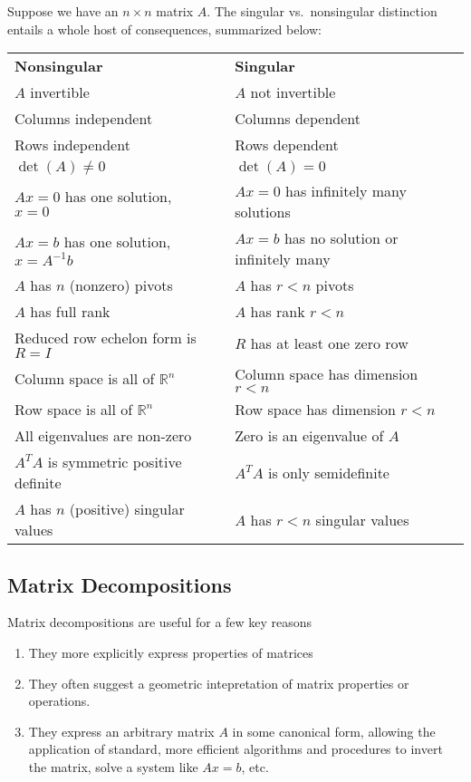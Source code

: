 \documentclass[12pt]{article}
\numberwithin{equation}{section} %
\theoremstyle{plain}
\theoremstyle{definition}
\theoremstyle{remark}
\begin{document}
Suppose we have an $n\times n$ matrix $A$. The singular vs.\ nonsingular
distinction entails a whole host of consequences, summarized below:
\begin{table}[h!]
\centering
\begin{tabular}{lll}
\textbf{Nonsingular}                     && \textbf{Singular} \\
$A$ invertible                           && $A$ not invertible \\
Columns independent                      && Columns dependent \\
Rows independent                         && Rows dependent \\
$\det(A)\neq0$                           && $\det(A)=0$ \\
$Ax = 0$ has one solution, $x = 0$       && $Ax=0$ has infinitely many solutions\\
$Ax = b$ has one solution, $x = A^{-1}b$ && $Ax = b$ has no solution or infinitely many \\
$A$ has $n$ (nonzero) pivots             && $A$ has $r<n$ pivots \\
$A$ has full rank                        && $A$ has rank $r<n$ \\
Reduced row echelon form is $R = I$      && $R$ has at least one zero row \\
Column space is all of $\mathbb{R}^n$    && Column space has dimension $r<n$ \\
Row space is all of $\mathbb{R}^n$       && Row space has dimension $r<n$ \\
All eigenvalues are non-zero             && Zero is an eigenvalue of $A$ \\
$A^T A$ is symmetric positive definite   && $A^T A$ is only semidefinite \\
$A$ has $n$ (positive) singular values   && $A$ has $r<n$ singular values
\end{tabular}
\end{table}


\subsection{Matrix Decompositions}
\label{subsec:decomp}

Matrix decompositions are useful for a few key reasons
\begin{enumerate}
\item They more explicitly express properties of matrices
\item They often suggest a geometric intepretation of matrix properties
  or operations.
\item They express an arbitrary matrix $A$ in some canonical form, allowing
  the application of standard, more efficient algorithms and procedures
  to invert the matrix, solve a system like $Ax =b$, etc.
\end{enumerate}
\end{document}
